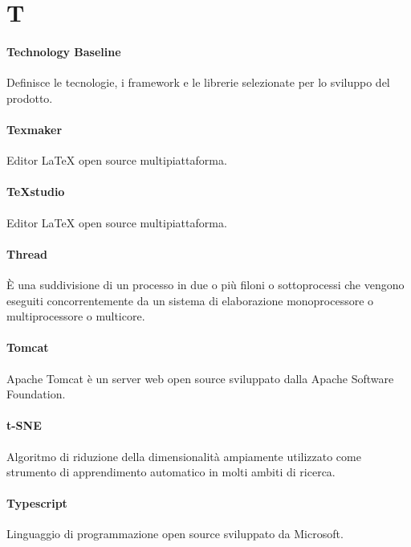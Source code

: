 \documentclass[]{article}
\begin{document}
	\newpage
	
	\section*{T}
	
	\paragraph*{Technology Baseline}
	Definisce le tecnologie, i framework e le librerie selezionate per lo sviluppo del prodotto.
	
	\paragraph*{Texmaker}
	Editor LaTeX open source multipiattaforma.

	\paragraph*{TeXstudio}
	Editor LaTeX open source multipiattaforma.
	
	\paragraph*{Thread}
	È una suddivisione di un processo in due o più filoni o sottoprocessi che vengono eseguiti concorrentemente da un sistema di elaborazione monoprocessore o multiprocessore o multicore.
	
	\paragraph*{Tomcat}
	Apache Tomcat è un server web open source sviluppato dalla Apache Software Foundation.
	
	\paragraph*{t-SNE}
	Algoritmo di riduzione della dimensionalità ampiamente utilizzato come strumento di apprendimento automatico in molti ambiti di ricerca.
	
	\paragraph*{Typescript}
	Linguaggio di programmazione open source sviluppato da Microsoft.
	
	\newpage
	
\end{document}
